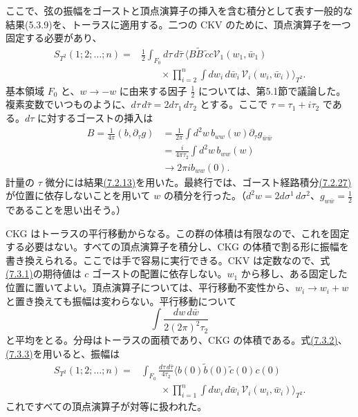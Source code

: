 
ここで、弦の振幅をゴーストと頂点演算子の挿入を含む積分として表す一般的な結果(5.3.9)を、トーラスに適用する。二つの CKV のために、頂点演算子を一つ固定する必要があり、
\begin{equation}
\begin{aligned}
S_{T^2}(1;2;\ldots;n)
={}&\frac12\int_{F_0}d\tau\,d\bar\tau\,
\biggl\langle B\tilde B\,\tilde c c\mathcal V_1(w_1,\bar w_1)\\
&\qquad\times
\prod_{i=2}^{n}\int dw_i\,d\bar w_i\,
\mathcal V_i(w_i,\bar w_i)\biggr\rangle_{T^2}.
\end{aligned}
\tag{7.3.1}\label{eq:7.3.1}
\end{equation}
基本領域 $F_0$ と、$w\to-w$ に由来する因子 $\tfrac12$ については、第5.1節で議論した。複素変数でいつものように、$d\tau\,d\bar\tau=2d\tau_1\,d\tau_2$ とする。ここで $\tau=\tau_1+i\tau_2$ である。$d\tau$ に対するゴーストの挿入は
\begin{equation}
\begin{aligned}
B=\frac1{4\pi}(b,\partial_\tau g)
&=\frac1{2\pi}\int d^2w\,b_{ww}(w)\partial_\tau g_{\bar w\bar w}\\
&=\frac i{4\pi\tau_2}\int d^2w\,b_{ww}(w)\\
&\longrightarrow2\pi i b_{ww}(0).
\end{aligned}
\tag{7.3.2}\label{eq:7.3.2}
\end{equation}
計量の $\tau$ 微分には結果\hyperref[eq:7.2.13]{(7.2.13)}を用いた。最終行では、ゴースト経路積分\hyperref[eq:7.2.27]{(7.2.27)}が位置に依存しないことを用いて $w$ の積分を行った。（$d^2w=2d\sigma^1\,d\sigma^2$、$g_{w\bar w}=\tfrac12$ であることを思い出そう。）

CKG はトーラスの平行移動からなる。この群の体積は有限なので、これを固定する必要はない。すべての頂点演算子を積分し、CKG の体積で割る形に振幅を書き換えられる。ここでは手で容易に実行できる。CKV は定数なので、式\hyperref[eq:7.3.1]{(7.3.1)}の期待値は $c$ ゴーストの配置に依存しない。$w_1$ から移し、ある固定した位置に置いてよい。頂点演算子については、平行移動不変性から、$w_i\to w_i+w$ と置き換えても振幅は変わらない。平行移動について
\begin{equation}
\int\frac{dw\,d\bar w}{2(2\pi)^2\tau_2}
\tag{7.3.3}\label{eq:7.3.3}
\end{equation}
と平均をとる。分母はトーラスの面積であり、CKG の体積である。式\hyperref[eq:7.3.2]{(7.3.2)}、\hyperref[eq:7.3.3]{(7.3.3)}を用いると、振幅は
\begin{equation}
\begin{aligned}
S_{T^2}(1;2;\ldots;n)
={}&\int_{F_0}\frac{d\tau\,d\bar\tau}{4\tau_2}
\biggl\langle b(0)\tilde b(0)\tilde c(0)c(0)\\
&\qquad\times
\prod_{i=1}^{n}\int dw_i\,d\bar w_i\,
\mathcal V_i(w_i,\bar w_i)\biggr\rangle_{T^2}.
\end{aligned}
\tag{7.3.4}\label{eq:7.3.4}
\end{equation}
これですべての頂点演算子が対等に扱われた。

